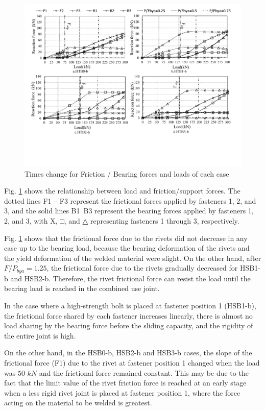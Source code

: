 \begin{figure}[htbp]
    \centering
    \includegraphics[width=1\linewidth]{imgs//ch4/fast-time-load.pdf}
    \caption{Times change for Friction / Bearing forces and loads of each case}
    \label{fig-fastime}
\end{figure}

Fig. \ref{fig-fastime} shows the relationship between load and friction/support forces. The dotted lines F1 -- F3 represent the frictional forces applied by fasteners 1, 2, and 3, and the solid lines B1~B3 represent the bearing forces applied by fasteners 1, 2, and 3, with X, □, and △ representing fasteners 1 through 3, respectively.

Fig. \ref{fig-fastime} shows that the frictional force due to the rivets did not decrease in any case up to the bearing load, because the bearing deformation of the rivets and the yield deformation of the welded material were slight. On the other hand, after $F / P_{bya}  = 1.25$, the frictional force due to the rivets gradually decreased for HSB1-b and HSB2-b. Therefore, the rivet frictional force can resist the load until the bearing load is reached in the combined use joint.

In the case where a high-strength bolt is placed at fastener position 1 (HSB1-b), the frictional force shared by each fastener increases linearly, there is almost no load sharing by the bearing force before the sliding capacity, and the rigidity of the entire joint is high.

On the other hand, in the HSB0-b, HSB2-b and HSB3-b cases, the slope of the frictional force (F1) due to the rivet at fastener position 1 changed when the load was 50 $kN$ and the frictional force remained constant. This may be due to the fact that the limit value of the rivet friction force is reached at an early stage when a less rigid rivet joint is placed at fastener position 1, where the force acting on the material to be welded is greatest.


